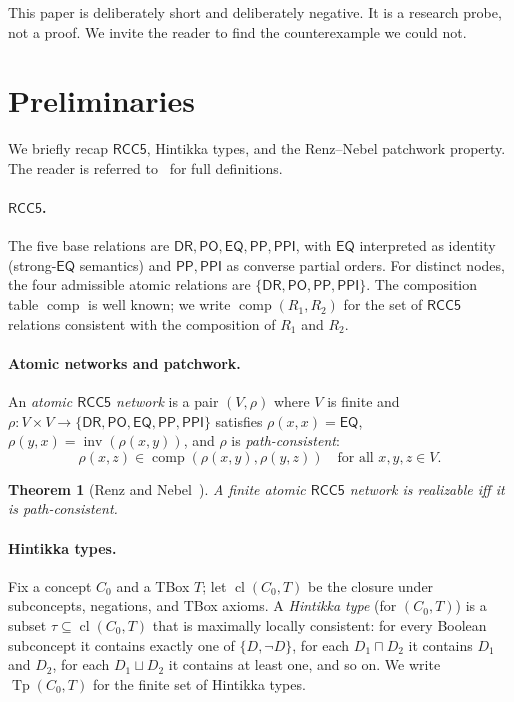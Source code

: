 \documentclass[11pt]{article}
\newtheorem{theorem}{Theorem}[section]
\theoremstyle{definition}
\theoremstyle{remark}
\newcommand{\DR}{\mathsf{DR}}
\newcommand{\PO}{\mathsf{PO}}
\newcommand{\PP}{\mathsf{PP}}
\newcommand{\PPI}{\mathsf{PPI}}
\newcommand{\EQ}{\mathsf{EQ}}
\newcommand{\RCC}{\{\DR,\PO,\PP,\PPI\}}
\newcommand{\RCCall}{\{\DR,\PO,\EQ,\PP,\PPI\}}
\newcommand{\cl}{\operatorname{cl}}
\newcommand{\Tp}{\operatorname{Tp}}
\newcommand{\comp}{\operatorname{comp}}
\newcommand{\inv}{\operatorname{inv}}
\begin{document}
This paper is deliberately short and deliberately negative.  It is a
research probe, not a proof.  We invite the reader to find the
counterexample we could not.

\section{Preliminaries}
\label{sec:prelim}

We briefly recap $\mathsf{RCC5}$, Hintikka types, and the Renz--Nebel
patchwork property.  The reader is referred
to~\cite{OverviewClaude, SplitForest, CompletenessExtraction} for
full definitions.

\paragraph{$\mathsf{RCC5}$.}  The five base relations are
$\DR, \PO, \EQ, \PP, \PPI$, with $\EQ$ interpreted as identity
(strong-$\EQ$ semantics) and $\PP, \PPI$ as converse partial orders.
For distinct nodes, the four admissible atomic relations are
$\RCC$.  The composition table $\comp$ is well known; we write
$\comp(R_1, R_2)$ for the set of $\mathsf{RCC5}$ relations consistent
with the composition of $R_1$ and $R_2$.

\paragraph{Atomic networks and patchwork.}
An \emph{atomic $\mathsf{RCC5}$ network} is a pair $(V, \rho)$ where
$V$ is finite and $\rho: V \times V \to \RCCall$ satisfies
$\rho(x,x) = \EQ$, $\rho(y,x) = \inv(\rho(x,y))$, and $\rho$ is
\emph{path-consistent}:
\[
  \rho(x,z) \in \comp(\rho(x,y), \rho(y,z))
  \quad \text{for all } x, y, z \in V.
\]

\begin{theorem}[Renz and Nebel~\cite{RenzNebel1999}]
\label{thm:rn}
A finite atomic $\mathsf{RCC5}$ network is realizable iff it is
path-consistent.
\end{theorem}

\paragraph{Hintikka types.}
Fix a concept $C_0$ and a TBox $T$; let $\cl(C_0, T)$ be the
closure under subconcepts, negations, and TBox axioms.  A
\emph{Hintikka type} (for $(C_0, T)$) is a subset
$\tau \subseteq \cl(C_0, T)$ that is maximally locally consistent:
for every Boolean subconcept it contains exactly one of
$\{D, \neg D\}$, for each $D_1 \sqcap D_2$ it contains $D_1$ and
$D_2$, for each $D_1 \sqcup D_2$ it contains at least one, and so on.
We write $\Tp(C_0, T)$ for the finite set of Hintikka types.
\end{document}
